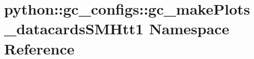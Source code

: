 \hypertarget{namespacepython_1_1gc__configs_1_1gc__makePlots__datacardsSMHtt1}{
\section{python::gc\_\-configs::gc\_\-makePlots\_\-datacardsSMHtt1 Namespace Reference}
\label{namespacepython_1_1gc__configs_1_1gc__makePlots__datacardsSMHtt1}
}
